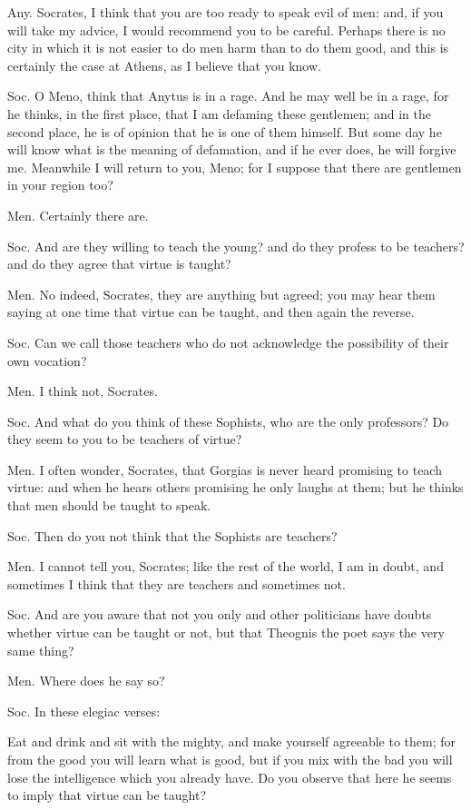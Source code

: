 Any. Socrates, I think that you are too ready to speak evil of men:
and, if you will take my advice, I would recommend you to be careful.
Perhaps there is no city in which it is not easier to do men harm
than to do them good, and this is certainly the case at Athens, as
I believe that you know. 

Soc. O Meno, think that Anytus is in a rage. And he may well be in
a rage, for he thinks, in the first place, that I am defaming these
gentlemen; and in the second place, he is of opinion that he is one
of them himself. But some day he will know what is the meaning of
defamation, and if he ever does, he will forgive me. Meanwhile I will
return to you, Meno; for I suppose that there are gentlemen in your
region too? 

Men. Certainly there are. 

Soc. And are they willing to teach the young? and do they profess
to be teachers? and do they agree that virtue is taught?

Men. No indeed, Socrates, they are anything but agreed; you may hear
them saying at one time that virtue can be taught, and then again
the reverse. 

Soc. Can we call those teachers who do not acknowledge the possibility
of their own vocation? 

Men. I think not, Socrates. 

Soc. And what do you think of these Sophists, who are the only professors?
Do they seem to you to be teachers of virtue? 

Men. I often wonder, Socrates, that Gorgias is never heard promising
to teach virtue: and when he hears others promising he only laughs
at them; but he thinks that men should be taught to speak.

Soc. Then do you not think that the Sophists are teachers?

Men. I cannot tell you, Socrates; like the rest of the world, I am
in doubt, and sometimes I think that they are teachers and sometimes
not. 

Soc. And are you aware that not you only and other politicians have
doubts whether virtue can be taught or not, but that Theognis the
poet says the very same thing? 

Men. Where does he say so? 

Soc. In these elegiac verses: 

Eat and drink and sit with the mighty, and make yourself agreeable
to them; for from the good you will learn what is good, but if you
mix with the bad you will lose the intelligence which you already
have. Do you observe that here he seems to imply that virtue can be
taught? 

